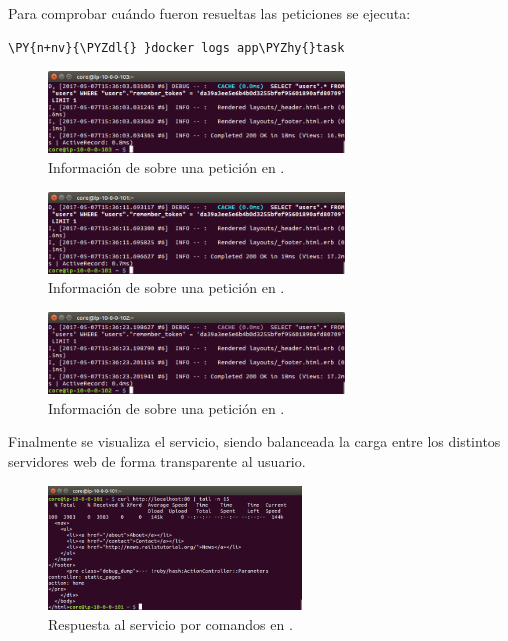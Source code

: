 Para comprobar cuándo fueron resueltas las peticiones se ejecuta:

\begin{framed_shaded}
\begin{Verbatim}[fontsize=\relsize{-2.5},fontseries=b,commandchars=\\\{\}]
\PY{n+nv}{\PYZdl{} }docker logs app\PYZhy{}task
\end{Verbatim}
\end{framed_shaded}

\begin{figure}[H]
\centering
\includegraphics[width=0.7\textwidth]{images/figures/logs3-confd.png}
\caption{Información de  sobre una petición en .}
\end{figure}

\begin{figure}[H]
\centering
\includegraphics[width=0.7\textwidth]{images/figures/logs1-confd.png}
\caption{Información de  sobre una petición en .}
\end{figure}

\begin{figure}[H]
\centering
\includegraphics[width=0.7\textwidth]{images/figures/logs2-confd.png}
\caption{Información de  sobre una petición en .}
\end{figure}

Finalmente se visualiza el servicio, siendo balanceada la carga entre los distintos servidores web de forma transparente al usuario.

\begin{figure}[H]
\centering
\includegraphics[width=0.6\textwidth]{images/figures/curl-confd.png}
\caption{Respuesta al servicio por comandos en . \label{curl-confd}}
\end{figure}

